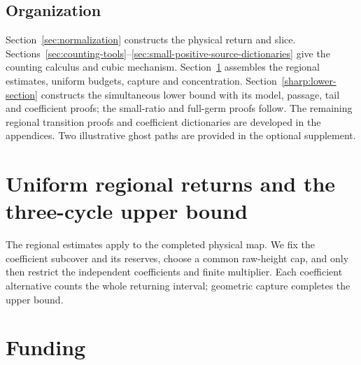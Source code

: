 \documentclass[a4paper,11pt]{article}
\numberwithin{equation}{section}
\theoremstyle{definition}
\theoremstyle{remark}
\begin{document}
\subsection{Organization}

Section~\ref{sec:normalization} constructs the physical return and
slice. Sections~\ref{sec:counting-tools}--\ref{sec:small-positive-source-dictionaries}
give the counting calculus and cubic mechanism.
Section~\ref{sec:common-cover-conclusion} assembles the regional
estimates, uniform budgets, capture and concentration.
Section~\ref{sharp:lower-section} constructs the simultaneous lower
bound with its model, passage, tail and coefficient proofs; the
small-ratio and full-germ proofs follow. The remaining regional transition
proofs and coefficient dictionaries are developed in the appendices.
Two illustrative ghost paths are provided in the optional supplement.
\medskip
\setcounter{tocdepth}{1}
\tableofcontents
\medskip




\section{Uniform regional returns and the three-cycle upper bound}
\label{sec:common-cover-conclusion}

The regional estimates apply to the completed physical map. We fix
the coefficient subcover and its reserves, choose a common raw-height
cap, and only then restrict the independent coefficients and finite
multiplier. Each coefficient alternative counts the whole returning
interval; geometric capture completes the upper bound.













\appendix














\section*{Funding}
\end{document}
